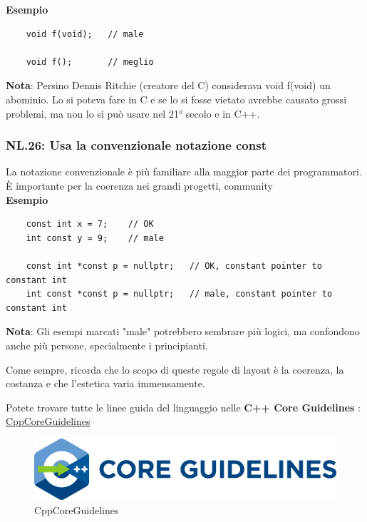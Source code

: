 \textsf{\small \textbf{Esempio}}

\begin{lstlisting}
	void f(void);   // male
	
	void f();       // meglio
\end{lstlisting}

\textsf{\small \textbf{Nota}: Persino Dennis Ritchie (creatore del C) considerava void f(void) un abominio. Lo si poteva fare in C e se lo si fosse vietato avrebbe causato grossi problemi, ma non lo si può usare nel 21° secolo e in C++. } \\

\subsubsection{NL.26: Usa la convenzionale notazione const}

\textsf{\small La notazione convenzionale è più familiare alla maggior parte dei programmatori. È importante per la coerenza nei grandi progetti, community} \\

\textsf{\small \textbf{Esempio}}

\begin{lstlisting}
	const int x = 7;    // OK
	int const y = 9;    // male
	
	const int *const p = nullptr;   // OK, constant pointer to constant int
	int const *const p = nullptr;   // male, constant pointer to constant int
\end{lstlisting}

\textsf{\small \textbf{Nota}: Gli esempi marcati "male" potrebbero sembrare più logici, ma confondono anche più persone, specialmente i principianti.} \break

\textsf{\small Come sempre, ricorda che lo scopo di queste regole di layout è la coerenza, la costanza e che l'estetica varia immensamente.} \\

\newpage

\textsf{\small Potete trovare tutte le linee guida del linguaggio nelle \textbf{C++ Core Guidelines} : \href{https://github.com/isocpp/CppCoreGuidelines}{CppCoreGuidelines}} \\

\begin{figure}[H]
	\centering
	\includegraphics[width=1\textwidth, height=1\textheight, keepaspectratio]{./imgs/CppCoreGuidelines.png}
	\caption{CppCoreGuidelines}
	\label{fig:CppCoreGuidelines}
\end{figure}

